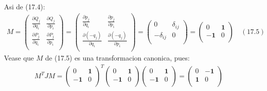 \documentclass[a4paper]{article}
\begin{document}
\begin{answer}[Punto 3]
     Asi de (17.4):
        \begin{align*}
            M = \begin{pmatrix}
                \frac{\partial Q_j}{\partial q_i} & \frac{\partial Q_j}{\partial p_i}\\
                \frac{\partial P_j}{\partial q_i} & \frac{\partial P_j}{\partial p_i}\\
            \end{pmatrix} = \begin{pmatrix}
                \frac{\partial p_j }{\partial q_i} & \frac{\partial p_j }{\partial p_i}\\
                \frac{\partial (-q_j) }{\partial q_i} & \frac{\partial (-q_j) }{\partial p_i}\\
            \end{pmatrix} = \begin{pmatrix}
                0 & \delta_{ij}\\
                -\delta_{ij} & 0\\
            \end{pmatrix} = \begin{pmatrix}
                0 & \mathbf 1\\
                -\mathbf 1 & 0\\
            \end{pmatrix} \quad (17.5)
        \end{align*}
        Vease que $M$ de (17.5) es una transformacion canonica, pues:
        \begin{align*}
            M^T J M = \begin{pmatrix}
                0 & \mathbf 1\\
                -\mathbf 1 & 0\\
            \end{pmatrix}^T \begin{pmatrix}
                0 & \mathbf 1\\
                -\mathbf 1 & 0\\
            \end{pmatrix} \begin{pmatrix}
                0 & \mathbf 1\\
                -\mathbf 1 & 0\\
            \end{pmatrix}
            = \begin{pmatrix}
                0 & -\mathbf 1\\
                \mathbf 1 & 0\\

\end{pmatrix}
\end{align*}
\end{answer}
\end{document}
